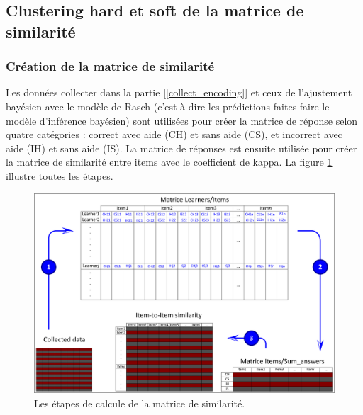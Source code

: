 \subsection{Clustering hard et soft de la matrice de similarité}

\subsubsection{Création de la matrice de similarité}
Les données collecter dans la partie [\ref{collect_encoding}] et ceux de l’ajustement bayésien avec le modèle de Rasch (c’est-à dire les prédictions faites faire le modèle d’inférence bayésien) sont utilisées pour créer la matrice de réponse selon quatre catégories : correct avec aide (CH) et sans aide (CS), et incorrect avec aide (IH) et sans aide (IS). La matrice de réponses est ensuite utilisée pour créer la matrice de similarité entre items avec le coefficient de kappa. La figure \ref{similarity_steps} illustre toutes les étapes. 

\begin{figure}[H]
	\begin{center}
		\includegraphics[width=\textwidth]{images/chapitre7/similarity_steps.png}
	\end{center}
	\caption{Les étapes de calcule de la matrice de similarité.}
	\label{similarity_steps}
\end{figure}

